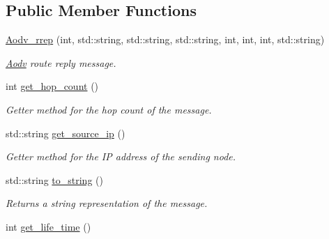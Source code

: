 \subsection*{Public Member Functions}
\begin{DoxyCompactItemize}
\item 
\hyperlink{class_aodv__rrep_a3df34ecb2cda085a3ceaef7d36c59a21}{Aodv\+\_\+rrep} (int, std\+::string, std\+::string, std\+::string, int, int, int, std\+::string)\hypertarget{class_aodv__rrep_a3df34ecb2cda085a3ceaef7d36c59a21}{}\label{class_aodv__rrep_a3df34ecb2cda085a3ceaef7d36c59a21}

\begin{DoxyCompactList}\small\item\em \hyperlink{class_aodv}{Aodv} route reply message. \end{DoxyCompactList}\item 
int \hyperlink{class_aodv__rrep_a5e9e495a15cdff5c8996f6d809778074}{get\+\_\+hop\+\_\+count} ()\hypertarget{class_aodv__rrep_a5e9e495a15cdff5c8996f6d809778074}{}\label{class_aodv__rrep_a5e9e495a15cdff5c8996f6d809778074}

\begin{DoxyCompactList}\small\item\em Getter method for the hop count of the message. \end{DoxyCompactList}\item 
std\+::string \hyperlink{class_aodv__rrep_a5acc147ba171378fe0e27bdd4210925d}{get\+\_\+source\+\_\+ip} ()\hypertarget{class_aodv__rrep_a5acc147ba171378fe0e27bdd4210925d}{}\label{class_aodv__rrep_a5acc147ba171378fe0e27bdd4210925d}

\begin{DoxyCompactList}\small\item\em Getter method for the IP address of the sending node. \end{DoxyCompactList}\item 
std\+::string \hyperlink{class_aodv__rrep_a4cd8e202122b563276c4395ff2bcd32d}{to\+\_\+string} ()\hypertarget{class_aodv__rrep_a4cd8e202122b563276c4395ff2bcd32d}{}\label{class_aodv__rrep_a4cd8e202122b563276c4395ff2bcd32d}

\begin{DoxyCompactList}\small\item\em Returns a string representation of the message. \end{DoxyCompactList}\item 
int \hyperlink{class_aodv__rrep_a9c8244ec089fb98cd0db200ae04343bd}{get\+\_\+life\+\_\+time} ()\hypertarget{class_aodv__rrep_a9c8244ec089fb98cd0db200ae04343bd}{}\label{class_aodv__rrep_a9c8244ec089fb98cd0db200ae04343bd}


\end{DoxyCompactItemize}
